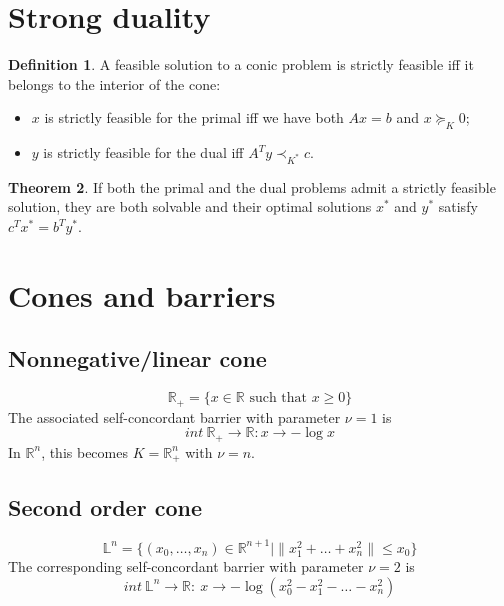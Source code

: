 \documentclass[12pt, openany]{report}
\newcommand{\R}{\mathbb{R}}
\theoremstyle{definition}
\newtheorem{thm}{Theorem}[chapter]
\newtheorem{definition}[thm]{Definition}
\begin{document}
\section{Strong duality}
\begin{definition}
    A feasible solution to a conic problem is strictly feasible iff it belongs to the interior of the cone:
    \begin{itemize}
        \item $x$ is strictly feasible for the primal iff we have both $Ax=b$ and $x\succeq_K0$;
        \item $y$ is strictly feasible for the dual iff $A^Ty\prec_{K^*}c$.
    \end{itemize}
\end{definition}
\begin{thm}
    If both the primal and the dual problems admit a strictly feasible solution, they are both solvable and their optimal solutions $x^*$ and $y^*$ satisfy $c^Tx^*=b^Ty^*$.
\end{thm}
\section{Cones and barriers}
\subsection{Nonnegative/linear cone}
\begin{equation}
    \R_+=\{x\in\R \text{ such that }x\ge 0\}
\end{equation}
The associated self-concordant barrier with parameter $\nu=1$ is 
\begin{equation}
    int \: \R_+ \rightarrow \R:x\rightarrow -\log x
\end{equation}
In $\R^n$, this becomes $K=\R_+^n$ with $\nu=n$. 
\subsection{Second order cone}
\begin{equation}
    \mathbb{L}^n = \{(x_0,\dots,x_n)\in \R^{n+1}|\lVert x_1^2+\dots+x_n^2\rVert\le x_0\}
\end{equation}
The corresponding self-concordant barrier with parameter $\nu=2$ is 
\begin{equation}
    int \: \mathbb{L}^n \rightarrow \R :\: x \rightarrow -\log(x_0^2-x_1^2 - \dots-x_n^2)
\end{equation}
\end{document}
